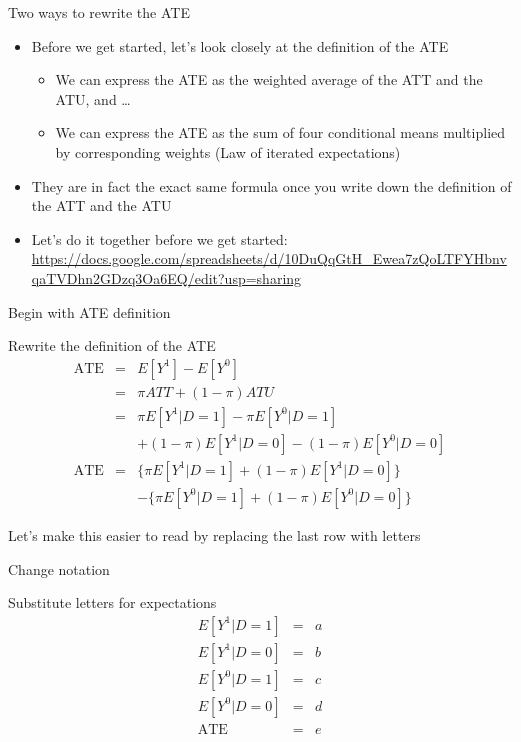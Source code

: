 \documentclass{beamer}
\begin{document}
\begin{frame}{Two ways to rewrite the ATE}

\begin{itemize}
\item Before we get started, let's look closely at the definition of the ATE
	\begin{itemize}
	\item We can express the ATE as the weighted average of the ATT and the ATU, and \dots
	\item We can express the ATE as the sum of four conditional means multiplied by corresponding weights (Law of iterated expectations)
	\end{itemize}
\item They are in fact the exact same formula once you write down the definition of the ATT and the ATU
\item Let's do it together before we get started: \url{https://docs.google.com/spreadsheets/d/10DuQqGtH_Ewea7zQoLTFYHbnvqaTVDhn2GDzq3Oa6EQ/edit?usp=sharing}

\end{itemize}

\end{frame}


\begin{frame}{Begin with ATE definition}

  \begin{block}{Rewrite the definition of the ATE}
    \begin{eqnarray*}
      \text{ATE}&=&E[Y^1]-E[Y^0]  \\
      &=& \pi ATT + (1-\pi) ATU \\
      &=& \pi E[Y^1 | D=1] - \pi E[Y^0 | D=1]  \\
      & & + (1-\pi) E[Y^1|D=0] - (1-\pi) E[Y^0 | D=0] \\
      \text{ATE}&=& \{\pi E[Y^1 | D=1] + (1-\pi)E[Y^1 | D=0]\}  \\
      & & - \{\pi E[Y^0|D=1] + (1-\pi) E[Y^0 | D=0]\}
    \end{eqnarray*}
  \end{block}

\bigskip

Let's make this easier to read by replacing the last row with letters

\end{frame}

\begin{frame}{Change notation}



  \begin{block}{Substitute letters for expectations}
    \begin{eqnarray*}
      E[Y^1|D=1] &=& a  \\
      E[Y^1|D=0] &=& b  \\
      E[Y^0|D=1] &=& c  \\
      E[Y^0|D=0] &=& d  \\
      \text{ATE} &=& e
    \end{eqnarray*}
  \end{block}
  



\end{frame}
\end{document}
